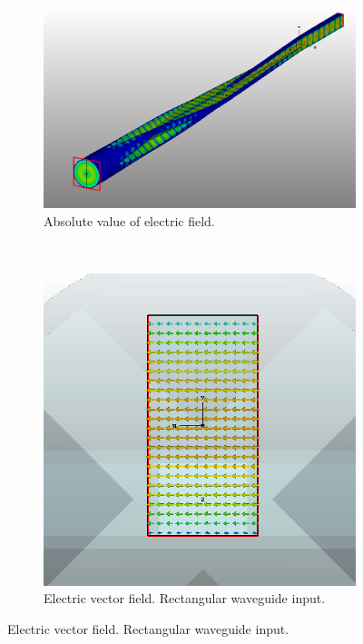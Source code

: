 \documentclass[english,twoside]{article}
\begin{document}
	\newpage
	\begin{landscape}
		\begin{figure}
			\centering
			\begin{subfigure}[b]{0.6\textwidth}
				\includegraphics[width=\textwidth]{figures/marie_abs}
				\caption{Absolute value of electric field.}
			\end{subfigure}
			~
			\begin{subfigure}[b]{0.45\textwidth}
				\includegraphics[width=\textwidth]{figures/marie_input}
				\caption{Electric vector field. Rectangular waveguide input.}

\end{subfigure}
\end{figure}
\end{landscape}
\end{document}
